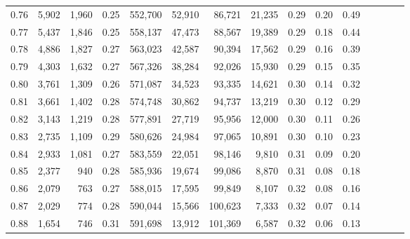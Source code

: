 \begin{tabular}{rrrcrrrrrrrrrrr}
0.76 &   5,902 &  1,960 &                                       0.25 &  552,700 &   52,910 &   86,721 &   21,235 &  0.29 &  0.20 &                         0.49 \\
0.77 &   5,437 &  1,846 &                                       0.25 &  558,137 &   47,473 &   88,567 &   19,389 &  0.29 &  0.18 &                         0.44 \\
0.78 &   4,886 &  1,827 &                                       0.27 &  563,023 &   42,587 &   90,394 &   17,562 &  0.29 &  0.16 &                         0.39 \\
0.79 &   4,303 &  1,632 &                                       0.27 &  567,326 &   38,284 &   92,026 &   15,930 &  0.29 &  0.15 &                         0.35 \\
0.80 &   3,761 &  1,309 &                                       0.26 &  571,087 &   34,523 &   93,335 &   14,621 &  0.30 &  0.14 &                         0.32 \\
0.81 &   3,661 &  1,402 &                                       0.28 &  574,748 &   30,862 &   94,737 &   13,219 &  0.30 &  0.12 &                         0.29 \\
0.82 &   3,143 &  1,219 &                                       0.28 &  577,891 &   27,719 &   95,956 &   12,000 &  0.30 &  0.11 &                         0.26 \\
0.83 &   2,735 &  1,109 &                                       0.29 &  580,626 &   24,984 &   97,065 &   10,891 &  0.30 &  0.10 &                         0.23 \\
0.84 &   2,933 &  1,081 &                                       0.27 &  583,559 &   22,051 &   98,146 &    9,810 &  0.31 &  0.09 &                         0.20 \\
0.85 &   2,377 &    940 &                                       0.28 &  585,936 &   19,674 &   99,086 &    8,870 &  0.31 &  0.08 &                         0.18 \\
0.86 &   2,079 &    763 &                                       0.27 &  588,015 &   17,595 &   99,849 &    8,107 &  0.32 &  0.08 &                         0.16 \\
0.87 &   2,029 &    774 &                                       0.28 &  590,044 &   15,566 &  100,623 &    7,333 &  0.32 &  0.07 &                         0.14 \\
0.88 &   1,654 &    746 &                                       0.31 &  591,698 &   13,912 &  101,369 &    6,587 &  0.32 &  0.06 &                         0.13 \\

\end{tabular}
